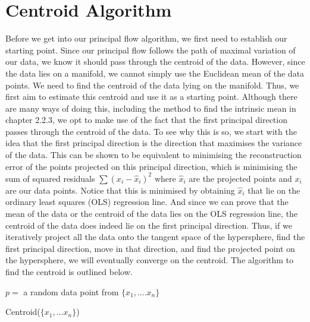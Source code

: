 \documentclass[12pt]{report}
\begin{document}
\section{Centroid Algorithm}
Before we get into our principal flow algorithm, we first need to 
establish our starting point. Since our principal flow 
follows the path of maximal variation of our data, 
we know it should pass through the centroid of the data. 
However, since the data lies on a manifold, we cannot simply use the 
Euclidean mean of the data points. We need to find the centroid of the data
lying on the manifold.
Thus, we first aim to estimate this centroid and use it as a starting point.
Although there are many ways of doing this,
including the method to find the intrinsic mean in chapter 2.2.3,
we opt to make use of the fact that 
the first principal direction passes through the centroid of the data.
To see why this is so, we start with the idea that the first principal direction
is the direction that maximises the variance of the data. 
This can be shown to be equivalent to minimising the reconstruction error of 
the points projected on this principal direction, 
which is minimising the sum of squared residuals
$\sum(x_i - \hat{x}_i)^2$ where $\hat{x}_i$ are the projected points and 
$x_i$ are our data points. 
Notice that this is minimised by obtaining $\hat{x}_i$
that lie on the ordinary least squares (OLS) regression line.
And since we can prove that the mean of the data or the centroid of the data
lies on the OLS regression line, the centroid of the data 
does indeed lie on the first principal direction.
Thus, if we iteratively project all the data onto the tangent space of the hypersphere, 
find the first principal direction, move in that direction, 
and find the projected point on the hypersphere, we will eventually converge on the 
centroid. The algorithm to find the centroid is outlined below.
\begin{algorithm}
    $p = $ a random data point from $\{x_1,....x_n\}$\;
    \caption{Centroid($\{x_1,...x_n\}$)}
\end{algorithm}
\end{document}
